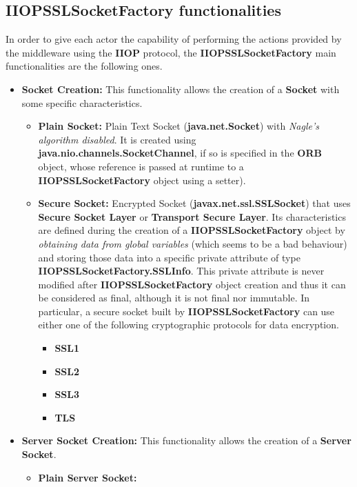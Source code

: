 \subsection{IIOPSSLSocketFactory functionalities}
In order to give each actor the capability of performing the actions provided by the middleware using the \textbf{IIOP} protocol, the \textbf{IIOPSSLSocketFactory} main functionalities are the following ones.
\begin{itemize}
	\item \textbf{Socket Creation:}
		This functionality allows the creation of a \textbf{Socket} with some specific characteristics.
		\begin{itemize}
			\item \textbf{Plain Socket:}
				Plain Text Socket (\textbf{java.net.Socket}) with \textit{Nagle's algorithm disabled}.
				It is created using \textbf{java.nio.channels.SocketChannel}, if so is specified in the \textbf{ORB} object, whose reference is passed at runtime to a \textbf{IIOPSSLSocketFactory} object using a setter).
			\item \textbf{Secure Socket:}
				Encrypted Socket (\textbf{javax.net.ssl.SSLSocket}) that uses \textbf{Secure Socket Layer} or \textbf{Transport Secure Layer}.
				Its characteristics are defined during the creation of a \textbf{IIOPSSLSocketFactory} object by \textit{obtaining data from global variables} (which seems to be a bad behaviour) and storing those data into a specific private attribute of type \textbf{IIOPSSLSocketFactory.SSLInfo}.
				This private attribute is never modified after \textbf{IIOPSSLSocketFactory} object creation and thus it can be considered as final, although it is not final nor immutable.
				In particular, a secure socket built by \textbf{IIOPSSLSocketFactory} can use either one of the following cryptographic protocols for data encryption.
				\begin{itemize}
					\item \textbf{SSL1} 
					\item \textbf{SSL2}
					\item \textbf{SSL3}
					\item \textbf{TLS}
				\end{itemize}
		\end{itemize}
	\item \textbf{Server Socket Creation:}
		This functionality allows the creation of a \textbf{Server Socket}.
		\begin{itemize}
			\item \textbf{Plain Server Socket:}

\end{itemize}
\end{itemize}
